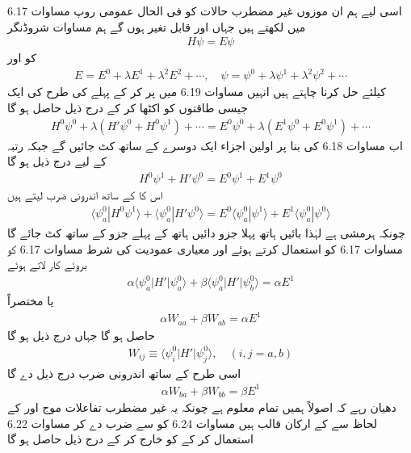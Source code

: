 اسی لیے ہم ان موزوں غیر مضطرب حالات کو فی الحال عمومی روپ مساوات 6.17 میں لکھتے ہیں جہاں  اور  قابل تغیر ہوں گے ہم مساوات شروڈنگر
\begin{align}
H \psi = E \psi
\end{align}
کو  اور 
\begin{align}
E = E^0 + \lambda E^1 + \lambda^2 E^2 + \cdots, \quad \psi = \psi^0 + \lambda \psi^1 + \lambda^2 \psi^2 + \cdots
\end{align}
کیلئے حل کرنا چاہتے ہیں انہیں مساوات 6.19 میں پر کر کے پہلے کی طرح  کی ایک جیسی طاقتوں کو اکٹھا کر کے درج ذیل حاصل ہو گا 
\begin{align*}
H^0 \psi^0 + \lambda (H' \psi^0 + H^0 \psi^1) + \cdots = E^0 \psi^0 + \lambda (E^1 \psi^0 + E^0 \psi^1) + \cdots
\end{align*}
اب  مساوات 6.18 کی بنا پر اولین اجزاء ایک دوسرے کے ساتھ کٹ جائیں گے جبکہ  رتبہ کے لیے درج ذیل ہو گا 
\begin{align}
H^0 \psi^1 + H' \psi^0 = E^0 \psi^1 + E^1 \psi^0
\end{align}
اس کا  کے ساتھ اندرونی ضرب لیتے ہیں 
\begin{align*} 
\langle \psi_a^0 | H^0 \psi^1 \rangle + \langle \psi_a^0 | H' \psi^0 \rangle = E^0 \langle \psi_a^0 | \psi^1 \rangle + E^1 \langle \psi_a^0 | \psi^0 \rangle
\end{align*}
چونکہ  ہرمشی ہے لہٰذا  بائیں ہاتھ پہلا جزو دائیں ہاتھ کے پہلے جزو کے ساتھ کٹ جائے گا مساوات 6.17 کو استعمال کرتے ہوئے اور معیاری عمودیت کی شرط مساوات 6.17 کو بروئے کار لاتے ہوئے 
\begin{align*}
\alpha \langle \psi_a^0 | H' | \psi_a^0 \rangle + \beta \langle \psi_a^0 | H' | \psi_b^0 \rangle = \alpha E^1
\end{align*}
یا مختصراً
\begin{align}
\alpha W_{aa} + \beta W_{ab} = \alpha E^1
\end{align}
حاصل ہو گا جہاں درج ذیل ہو گا 
\begin{align}
W_{ij} \equiv \langle \psi_i^0 | H' | \psi_j^0 \rangle, \quad (i, j = a, b)
\end{align}
اسی طرح  کے ساتھ اندرونی ضرب درج ذیل دے گا 
\begin{align}
\alpha W_{ba} + \beta W_{bb} = \beta E^1
\end{align}
دھیان رہے کہ اصولاً ہمیں تمام  معلوم ہے چونکہ یہ غیر مضطرب تفاعلات موج  اور  کے لحاظ سے  کے ارکان قالب ہیں مساوات 6.24 کو  سے ضرب دے کر مساوات 6.22 استعمال کر کے  کو خارج کر کے درج ذیل حاصل ہو گا 
